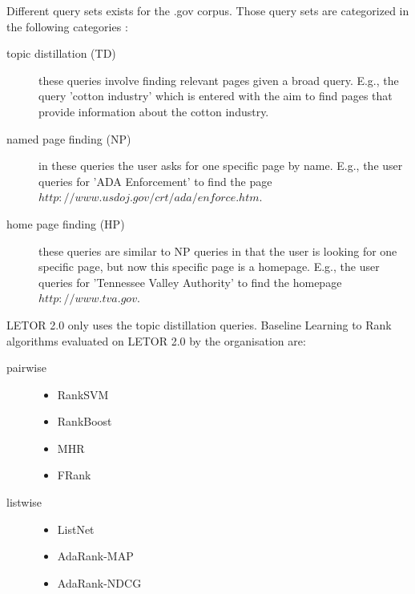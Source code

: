 Different query sets exists for the .gov corpus. Those query sets are categorized in the following categories \cite{Craswell2003}:
\begin{description}
\item[topic distillation (TD)]these queries involve finding relevant pages given a broad query. E.g., the query 'cotton industry' which is entered with the aim to find pages that provide information about the cotton industry.
\item[named page finding (NP)]in these queries the user asks for one specific page by name. E.g., the user queries for 'ADA Enforcement' to find the page $http://www.usdoj.gov/crt/ada/enforce.htm$.
\item[home page finding (HP)]these queries are similar to NP queries in that the user is looking for one specific page, but now this specific page is a homepage. E.g., the user queries for 'Tennessee Valley Authority' to find the homepage $http://www.tva.gov$.
\end{description}

LETOR 2.0 only uses the topic distillation queries. Baseline Learning to Rank algorithms evaluated on LETOR 2.0 by the organisation are:
\begin{description}
\item[pairwise]{\leavevmode
	\begin{itemize}
	\item Rank\ac{SVM} \cite{Herbrich1999,Joachims2002}
	\item RankBoost \cite{Freund2003}
	\item \ac{MHR} \cite{Qin2007}
	\item FRank \cite{Tsai2007}
	\end{itemize}}
\item[listwise]{\leavevmode
	\begin{itemize}
	\item ListNet \cite{Cao2007}
	\item AdaRank-MAP \cite{Xu2007}
	\item AdaRank-NDCG \cite{Xu2007}
	\end{itemize}}
\end{description} 

